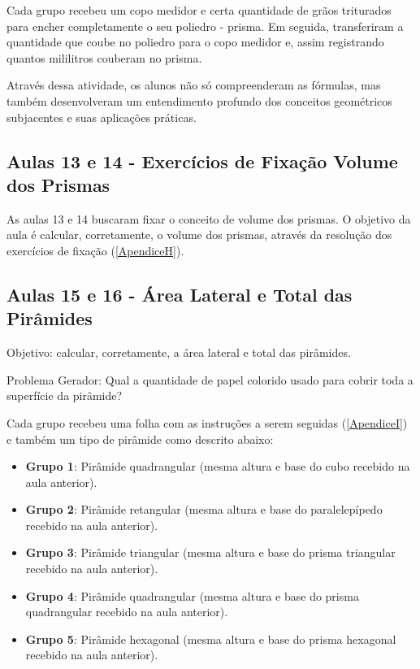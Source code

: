 Cada grupo recebeu um copo medidor e  certa quantidade de grãos triturados para encher completamente o seu poliedro - prisma. Em seguida, transferiram a quantidade que coube no poliedro para o copo medidor e, assim registrando quantos mililitros couberam no prisma.

Através dessa atividade, os alunos não só compreenderam as fórmulas, mas também desenvolveram um entendimento profundo dos conceitos geométricos subjacentes e suas aplicações práticas.

\subsection{Aulas 13 e 14 - Exercícios de Fixação Volume dos Prismas}

As aulas 13 e 14 buscaram fixar o conceito de volume dos prismas. O objetivo da aula é calcular, corretamente, o volume dos prismas, através da resolução dos exercícios de fixação (\autoref{ApendiceH}).

\subsection{Aulas 15 e 16 - Área Lateral e Total das Pirâmides}

Objetivo: calcular, corretamente, a área lateral e total das pirâmides.

Problema Gerador: Qual a quantidade de papel colorido usado para cobrir toda a superfície da pirâmide?

Cada grupo recebeu uma folha com as instruções a serem seguidas (\autoref{ApendiceI}) e também um tipo de pirâmide como descrito abaixo:

\begin{itemize}
    \item \textbf{Grupo 1}: Pirâmide quadrangular (mesma altura e base do cubo recebido na aula anterior).
    \item \textbf{Grupo 2}: Pirâmide retangular (mesma altura e base do paralelepípedo recebido na aula anterior).
    \item \textbf{Grupo 3}: Pirâmide triangular (mesma altura e base do prisma triangular recebido na aula anterior).
    \item \textbf{Grupo 4}: Pirâmide quadrangular (mesma altura e base do prisma quadrangular recebido na aula anterior).
    \item \textbf{Grupo 5}: Pirâmide hexagonal (mesma altura e base do prisma hexagonal recebido na aula anterior).
\end{itemize}

